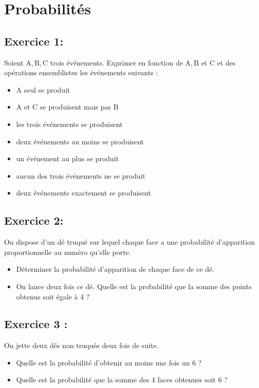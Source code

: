 \chapter{Probabilités}

\section*{Exercice 1:}

Soient \(\mathrm{A}, \mathrm{B}, \mathrm{C}\) trois événements. Exprimer en fonction de \(\mathrm{A}, \mathrm{B}\) et C et des opérations ensemblistes les événements suivants :

\begin{itemize}
    \item A seul se produit
    \item A et C se produisent mais pas B
    \item les trois événements se produisent
    \item deux événements au moins se produisent
    \item un événement au plus se produit
    \item aucun des trois événements ne se produit
    \item deux événements exactement se produisent
\end{itemize}

\section*{Exercice 2:}

On dispose d'un dé truqué sur lequel chaque face a une probabilité d'apparition proportionnelle au numéro qu'elle porte.

\begin{itemize}
\item Déterminer la probabilité d'apparition de chaque face de ce dé.
\item On lance deux fois ce dé. Quelle est la probabilité que la somme des points obtenus soit égale à 4 ?
\end{itemize}

\section*{Exercice 3 :}

On jette deux dés non truqués deux fois de suite.
\begin{itemize}
    \item Quelle est la probabilité d'obtenir au moins une fois un 6 ?
    \item Quelle est la probabilité que la somme des 4 faces obtenues soit 6 ?
\end{itemize}


